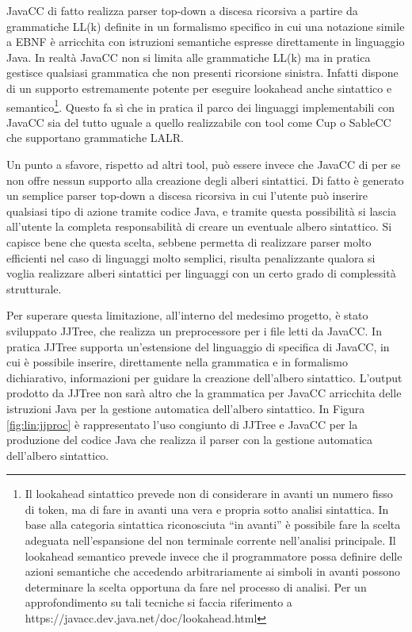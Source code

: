 JavaCC di fatto realizza parser top-down a discesa ricorsiva a partire da
grammatiche LL(k) definite in un formalismo specifico in cui una notazione simile
a EBNF è arricchita con istruzioni semantiche espresse direttamente in linguaggio
Java. In realtà JavaCC non si limita alle grammatiche LL(k) ma in pratica
gestisce qualsiasi grammatica che non presenti ricorsione sinistra. Infatti
dispone di un supporto estremamente potente per eseguire lookahead anche
sintattico e semantico\footnote{Il lookahead sintattico prevede non di
considerare in avanti un numero fisso di token, ma di fare in avanti una vera e
propria sotto analisi sintattica. In base alla categoria sintattica riconosciuta
``in avanti'' è possibile fare la scelta adeguata nell'espansione del non
terminale corrente nell'analisi principale. Il lookahead semantico prevede invece
che il programmatore  possa definire delle azioni semantiche che accedendo
arbitrariamente ai simboli in avanti possono determinare la scelta opportuna da
fare nel processo di analisi. Per un approfondimento su tali tecniche si faccia
riferimento a https://javacc.dev.java.net/doc/lookahead.html}. Questo fa sì che
in pratica il parco dei linguaggi implementabili con JavaCC sia del tutto uguale
a quello realizzabile con tool come Cup o SableCC che supportano grammatiche
LALR.

Un punto a sfavore, rispetto ad altri tool, può essere invece che JavaCC di per
se non offre nessun supporto alla creazione degli alberi sintattici. Di fatto
è generato un semplice parser top-down a discesa ricorsiva in cui l'utente può
inserire qualsiasi tipo di azione tramite codice Java, e tramite questa
possibilità si lascia all'utente la completa responsabilità di creare un
eventuale albero sintattico. Si capisce bene che questa scelta, sebbene permetta
di realizzare parser molto efficienti nel caso di linguaggi molto semplici,
risulta penalizzante qualora si voglia realizzare alberi sintattici per
linguaggi con un certo grado di complessità strutturale.

Per superare questa limitazione, all'interno del medesimo progetto, è stato
sviluppato JJTree, che realizza un preprocessore per i file letti da JavaCC. In
pratica JJTree supporta un'estensione del linguaggio di specifica di JavaCC, in
cui è possibile inserire, direttamente nella grammatica e in formalismo
dichiarativo, informazioni per guidare la creazione dell'albero sintattico.
L'output prodotto da JJTree non sarà altro che la grammatica per JavaCC
arricchita delle istruzioni Java per la gestione automatica dell'albero
sintattico. In Figura \ref{fig:lin:jjproc} è rappresentato l'uso
congiunto di JJTree e JavaCC per la produzione del codice Java che realizza il
parser con la gestione automatica dell'albero sintattico.

